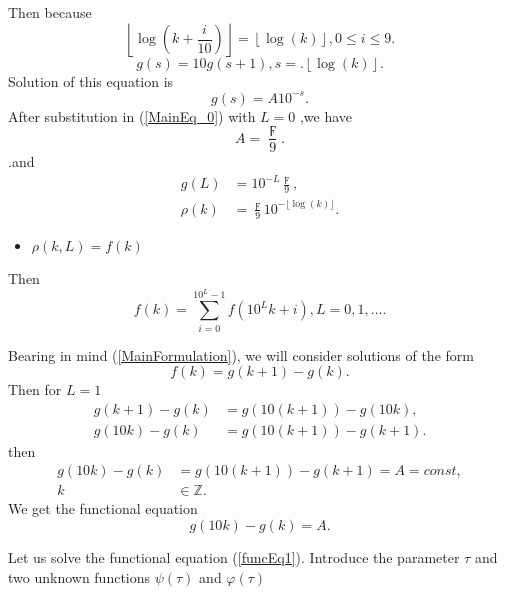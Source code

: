 \documentclass[titlepage,fleqn]{article}%
\providecommand{\U}[1]{\protect\rule{.1in}{.1in}}
\begin{document}
Then because%
\[
\left\lfloor \log\left(  k+\frac{i}{10}\right)  \right\rfloor =\left\lfloor
\log(k)\right\rfloor ,0\leq i\leq9.
\]%
\[
g(s)=10g(s+1),s=.\left\lfloor \log(k)\right\rfloor .
\]
Solution of this equation is%
\[
g(s)=A10^{-s}.
\]
After substitution in (\ref{MainEq_0}) with $L=0$ ,we have
\[
A=\frac{\digamma}{9}.
\]
.and%
\begin{align}
g(L)  &  =10^{-L}\frac{\digamma}{9},\label{SolL}\\
\rho(k)  &  =\frac{\digamma}{9}10^{-\lfloor\log(k)\rfloor}.\nonumber
\end{align}


\begin{itemize}
\item $\rho(k,L)=f(k)$
\end{itemize}

Then%
\begin{equation}
f(k)=%
{\displaystyle\sum\limits_{i=0}^{10^{L}-1}}
f(10^{L}k+i),L=0,1,\ldots. \label{SolEq2}%
\end{equation}


Bearing in mind (\ref{MainFormulation}), we will consider solutions of the
form%
\begin{equation}
f(k)=g(k+1)-g(k). \label{Sdiff1}%
\end{equation}
Then for $L=1$
\begin{align*}
g(k+1)-g(k)  &  =g(10(k+1))-g(10k),\\
g(10k)-g(k)  &  =g(10(k+1))-g(k+1).
\end{align*}
then
\begin{align*}
g(10k)-g(k)  &  =g(10(k+1))-g(k+1)=A=const,\\
k  &  \in%
\mathbb{Z}
.
\end{align*}
We get the functional equation
\begin{equation}
g(10k)-g(k)=A. \label{funcEq1}%
\end{equation}


Let us solve the functional equation (\ref{funcEq1}). Introduce the parameter
$\tau$ and two unknown functions $\psi(\tau)$ and $\varphi(\tau)$%
\end{document}
